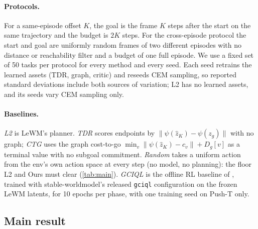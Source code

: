 \documentclass{article} %
\newcommand{\z}{z}
\newcommand{\psiT}{\psi}
\newcommand{\keypoints}[1]{\par\medskip\noindent\fcolorbox{black!50}{black!5}{\begin{minipage}{0.96\linewidth}\small
\textbf{Key points this section must land.}\begin{itemize}[nosep,leftmargin=1.2em]#1\end{itemize}\end{minipage}}\par\medskip}
\begin{document}
\paragraph{Protocols.}
For a same-episode offset $K$, the goal is the frame $K$ steps after the start on the same
trajectory and the budget is $2K$ steps. For the cross-episode protocol the start and goal are
uniformly random frames of two different episodes with no distance or reachability filter and a
budget of one full episode. We use a fixed set of 50 tasks per protocol for every
method and every seed. Each seed retrains the learned assets (TDR, graph, critic) and
reseeds CEM sampling, so reported standard deviations include both sources of variation;
L2 has no learned assets, and its seeds vary CEM sampling only.

\paragraph{Baselines.}
\emph{L2} is LeWM's planner. \emph{TDR} scores endpoints by $\|\psiT(\hat\z_K)-\psiT(\z_g)\|$ with no
graph; \emph{CTG} uses the graph cost-to-go $\min_v\|\psiT(\hat\z_K)-c_v\|+D_g[v]$ as a terminal value
with no subgoal commitment. \emph{Random} takes a uniform action from the env's own action space
at every step (no model, no planning): the floor L2 and Ours must clear (\cref{tab:main}).
\emph{GCIQL} is the offline RL baseline of \citet{lewm}, trained with stable-worldmodel's released
\texttt{gciql} configuration on the frozen LeWM latents, for 10 epochs per phase, with one training
seed on Push-T only.


\subsection{Main result}
\label{sec:main}
\end{document}
